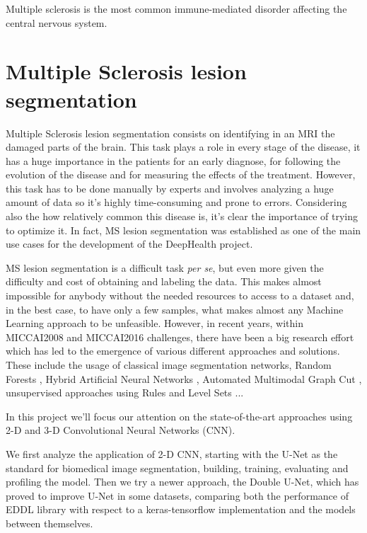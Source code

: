 Multiple sclerosis is the most common immune-mediated disorder affecting the central nervous system.



\newpage
\section{Multiple Sclerosis lesion segmentation}

Multiple Sclerosis lesion segmentation consists on identifying in an MRI the damaged parts of the brain. This task plays a role in every stage of the disease, it has a huge importance in the patients for an early diagnose, for following the evolution of the disease and for measuring the effects of the treatment. However, this task has to be done manually by experts and involves analyzing a huge amount of data so it's highly time-consuming and prone to errors. Considering also the how relatively common this disease is, it's clear the importance of trying to optimize it. In fact, MS lesion segmentation was established as one of the main use cases for the development of the DeepHealth project. 

MS lesion segmentation is a difficult task \textit{per se}, but even more given the difficulty and cost of obtaining and labeling the data. This makes almost impossible for anybody without the needed resources to access to a dataset and, in the best case, to have only a few samples, what makes almost any Machine Learning approach to be unfeasible. However, in recent years, within MICCAI2008 and MICCAI2016 challenges, there have been a big research effort which has led to the emergence of various different approaches and solutions. These include the usage of classical image segmentation networks\cite{MICCAI_MSSEG:2016}, Random Forests \cite{MICCAI_MSSEG:2016}, Hybrid Artificial Neural Networks \cite{MICCAI_MSSEG:2016}, Automated Multimodal Graph Cut \cite{MICCAI_MSSEG:2016}, unsupervised approaches using Rules and Level Sets \cite{MICCAI_MSSEG:2016}... 

In this project we'll focus our attention on the state-of-the-art approaches using 2-D and 3-D Convolutional Neural Networks (CNN). 

We first analyze the application of 2-D CNN, starting with the U-Net as the standard for biomedical image segmentation, building, training, evaluating and profiling the model. Then we try a newer approach, the Double U-Net, which has proved to improve U-Net in some datasets, comparing both the performance of EDDL library with respect to a keras-tensorflow implementation and the models between themselves.

